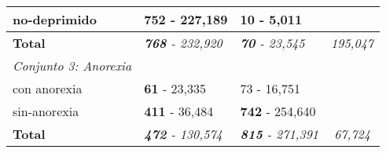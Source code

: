 \begin{table}[!hbt]
\begin{center}
\begin{tabular}{llll}
\rowcolor[HTML]{FFFFFF} 
no-deprimido                                                & \textbf{752} - 227,189                                & \textbf{10} - 5,011                                   &                                                              \\ \hline
\rowcolor[HTML]{FFFFFF} 
\textbf{Total}                                              & \textit{\textbf{768} - 232,920}                       & \textit{\textbf{70} - 23,545}                         & \multicolumn{1}{c}{\cellcolor[HTML]{FFFFFF}\textit{195,047}}    \\ \hline
\rowcolor[HTML]{EFEFEF} 
\textit{Conjunto 3: Anorexia}                               & \multicolumn{1}{c}{\cellcolor[HTML]{EFEFEF}} & \multicolumn{1}{c}{\cellcolor[HTML]{EFEFEF}} &                                                              \\ \hline
\rowcolor[HTML]{FFFFFF} 
con anorexia                                                & \textbf{61} - 23,335                                  & 73 - 16,751                                  &                                                              \\ \hline
\rowcolor[HTML]{FFFFFF} 
sin-anorexia                                                & \textbf{411} - 36,484                                 & \textbf{742} - 254,640                                &                                                              \\ \hline
\rowcolor[HTML]{FFFFFF} 
\textbf{Total}                                              & \textit{\textbf{472} - 130,574}                       & \textit{\textbf{815} - 271,391}                       & \multicolumn{1}{c}{\cellcolor[HTML]{FFFFFF}\textit{67,724}}  \\ \hline
\end{tabular}

\end{center}

\end{table}
